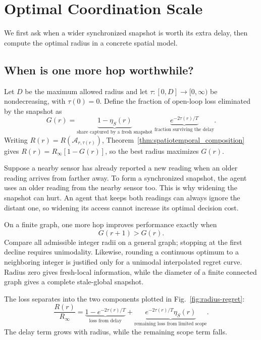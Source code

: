 \documentclass[11pt]{article}
\begin{document}
\section{Optimal Coordination Scale}
\label{sec:optimal_coordination_scale}

We first ask when a wider synchronized snapshot is worth its extra delay,
then compute the optimal radius in a concrete spatial model.

\subsection{When is one more hop worthwhile?}
\label{subsec:radius_dependent_architectures}

Let $D$ be the maximum allowed radius and let
$\tau:[0,D]\to[0,\infty)$ be nondecreasing, with $\tau(0)=0$.
Define the fraction of open-loop loss eliminated by the snapshot as
\begin{equation}
G(r)=\underbrace{1-\eta_S(r)}_{\text{share captured by a fresh snapshot}}
     \;\underbrace{e^{-2\tau(r)/T}}_{\text{fraction surviving the delay}}.
\label{eq:snapshot_gain}
\end{equation}
Writing $R(r)=R(\mathcal A_{r,\tau(r)})$,
Theorem~\ref{thm:spatiotemporal_composition} gives
$R(r)=R_\infty[1-G(r)]$, so the best radius maximizes $G(r)$.

Suppose a nearby sensor has already reported a new reading when an older
reading arrives from farther away. To form a synchronized snapshot, the agent
uses an older reading from the nearby sensor too. This is why widening the
snapshot can hurt. An agent that keeps both readings can always ignore the
distant one, so widening its access cannot increase its optimal decision cost.

On a finite graph, one more hop improves performance exactly when
\begin{equation}
G(r+1)>G(r).
\label{eq:discrete_radius_improvement}
\end{equation}
Compare all admissible integer radii on a general graph; stopping at the
first decline requires unimodality. Likewise, rounding a continuous optimum
to a neighboring integer is justified only for a unimodal interpolated
regret curve. Radius zero gives fresh-local information, while the diameter
of a finite connected graph gives a complete stale-global snapshot.

The loss separates into the two components plotted in
Fig.~\ref{fig:radius-regret}:
\begin{equation}
\frac{R(r)}{R_\infty}
=\underbrace{1-e^{-2\tau(r)/T}}_{\text{loss from delay}}
+\underbrace{e^{-2\tau(r)/T}\eta_S(r)}_{\text{remaining loss from limited scope}}.
\label{eq:R_decomposition}
\end{equation}
The delay term grows with radius, while the remaining scope term falls.
\end{document}
